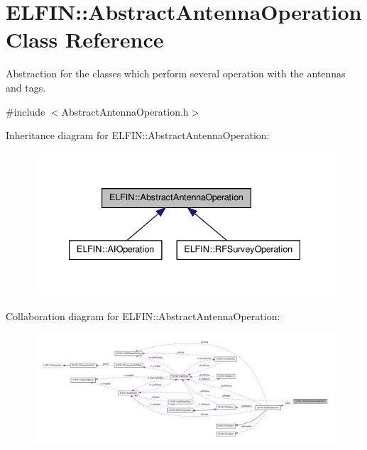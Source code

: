 \hypertarget{class_e_l_f_i_n_1_1_abstract_antenna_operation}{\section{E\-L\-F\-I\-N\-:\-:Abstract\-Antenna\-Operation Class Reference}
\label{class_e_l_f_i_n_1_1_abstract_antenna_operation}
}


Abstraction for the classes which perform several operation with the antennas and tags.  




{\ttfamily \#include $<$Abstract\-Antenna\-Operation.\-h$>$}



Inheritance diagram for E\-L\-F\-I\-N\-:\-:Abstract\-Antenna\-Operation\-:
\nopagebreak
\begin{figure}[H]
\begin{center}
\leavevmode
\includegraphics[width=336pt]{class_e_l_f_i_n_1_1_abstract_antenna_operation__inherit__graph}
\end{center}
\end{figure}


Collaboration diagram for E\-L\-F\-I\-N\-:\-:Abstract\-Antenna\-Operation\-:
\nopagebreak
\begin{figure}[H]
\begin{center}
\leavevmode
\includegraphics[width=350pt]{class_e_l_f_i_n_1_1_abstract_antenna_operation__coll__graph}
\end{center}
\end{figure}
